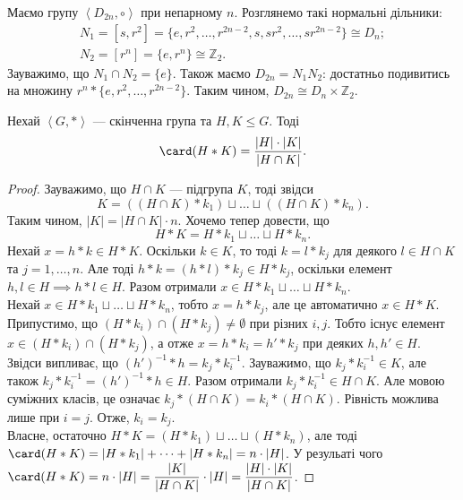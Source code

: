 \documentclass{math_library}
\begin{document}
\begin{example}
Маємо групу $\left<D_{2n}, \circ \right>$ при непарному $n$. Розглянемо такі нормальні дільники:
\begin{align*}
N_1 = [s,r^2] = \{e,r^2,\dots,r^{2n-2},s,sr^2,\dots,sr^{2n-2}\} \cong D_n;\\
N_2 = [r^n] = \{e,r^n\} \cong \mathbb{Z}_2.
\end{align*}
Зауважимо, що $N_1 \cap N_2 = \{e\}$. Також маємо $D_{2n} = N_1N_2$: достатньо подивитись на множину $r^n * \{e,r^2,\dots,r^{2n-2}\}$. Таким чином, $D_{2n} \cong D_n \times \mathbb{Z}_2$.
\end{example}

\begin{theorem}
Нехай $\left<G,*\right>$ --- скінченна група та $H,K \leq G$. Тоді \begin{align*}
\card(H*K) = \dfrac{|H| \cdot |K|}{|H \cap K|}.
\end{align*}
\end{theorem}

\begin{proof}
Зауважимо, що $H \cap K$ --- підгрупа $K$, тоді звідси 
\[
K = ((H \cap K)*k_1) \sqcup \dots \sqcup ((H \cap K)*k_n).
\]
Таким чином, $|K| = |H \cap K| \cdot n$. Хочемо тепер довести, що \[ 
H*K = H*k_1 \sqcup \dots \sqcup H*k_n.
\]
Нехай $x = h*k \in H*K$. Оскільки $k \in K$, то тоді $k = l*k_j$ для деякого $l \in H \cap K$ та $j = 1,\dots,n$. Але тоді $h*k = (h*l)*k_j \in H*k_j$, оскільки елемент $h,l \in H \implies h*l \in H$. Разом отримали $x \in H*k_1 \sqcup \dots \sqcup H*k_n$.\\
Нехай $x \in H*k_1 \sqcup \dots \sqcup H*k_n$, тобто $x = h*k_j$, але це автоматично $x \in H*K$.\\
Припустимо, що $(H*k_i) \cap (H*k_j) \neq \emptyset$ при різних $i,j$. Тобто існує елемент $x \in (H*k_i) \cap (H*k_j)$, а отже $x = h*k_i = h'*k_j$ при деяких $h,h' \in H$. Звідси випливає, що $(h')^{-1}*h = k_j*k_i^{-1}$. Зауважимо, що $k_j * k_i^{-1} \in K$, але також $k_j * k_i^{-1} = (h')^{-1}*h \in H$. Разом отримали $k_j * k_i^{-1} \in H \cap K$. Але мовою суміжних класів, це означає $k_j * (H \cap K) = k_i * (H \cap K)$. Рівність можлива лише при $i = j$. Отже, $k_i = k_j$.\\
Власне, остаточно $H*K = (H*k_1) \sqcup \dots \sqcup (H*k_n)$, але тоді $\card(H*K) = |H*k_1| + \dots + |H*k_n| = n \cdot |H|$. У резульаті чого $\card(H*K) = n \cdot |H| = \dfrac{|K|}{|H \cap K|} \cdot |H| = \dfrac{|H| \cdot |K|}{|H \cap K|}$.
\end{proof}
\end{document}
